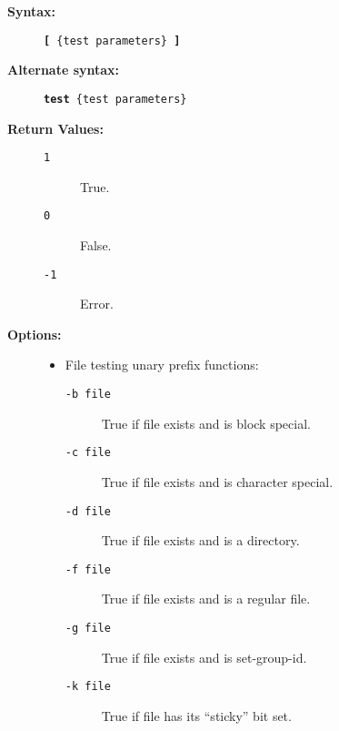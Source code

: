 \begin{description}
\item[{\bf Syntax:}] \mbox{}

{\tt {\bf {[}} \{test parameters\} {\bf {]}}}

\item[{\bf Alternate syntax:}] \mbox{}

{\tt {\bf {test}} \{test parameters\}}

\item[{\bf Return Values:}] \mbox{}

\begin{description}
\item[{\tt 1}] \mbox{}

True.

\item[{\tt 0}] \mbox{}

False.

\item[{\tt -1}] \mbox{}

Error.

\end{description}


\item[{\bf Options:}] \mbox{}

\begin{itemize}
\item File testing unary prefix functions:
\begin{description}
\item[{\tt -b file}] \mbox{}

True if file exists and is block special.

\item[{\tt -c file}] \mbox{}

True if file exists and is character special.

\item[{\tt -d file}] \mbox{}

True if file exists and is a directory.

\item[{\tt -f file}] \mbox{}

True if file exists and is a regular file.

\item[{\tt -g file}] \mbox{}

True if file exists and is set-group-id.

\item[{\tt -k file}] \mbox{}

True if file has its ``sticky'' bit set.


\end{description}
\end{itemize}
\end{description}
